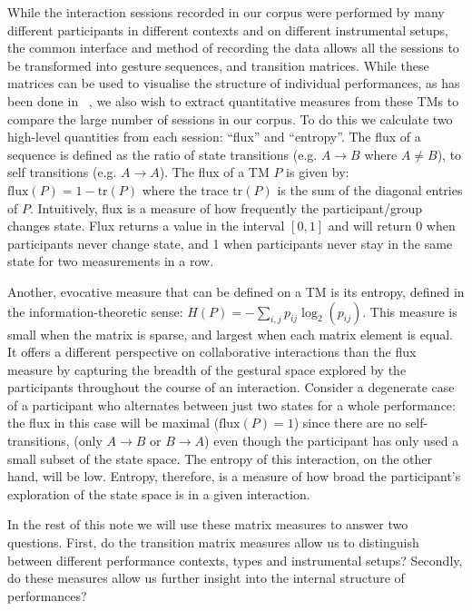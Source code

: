 \documentclass{sigchi}
\begin{document}
While the interaction sessions recorded in our corpus were performed
by many different participants in
different contexts and on different instrumental setups, the common
interface and method of recording the data allows all the sessions to
be transformed into gesture sequences, and transition matrices. While
these matrices can be used to visualise the structure of individual
performances, as has been done in ~\cite{Swift:2014tya}, we also wish to extract quantitative
measures from these TMs to compare the large number of sessions in our
corpus.
To do this we calculate two high-level quantities from each session:
``flux'' and ``entropy''. The flux of a sequence is defined as the
ratio of state transitions (e.g. $A \rightarrow B$ where $A \neq B$),
to self transitions (e.g. $A \rightarrow A $). The flux of a TM $P$ is
given by: $\mathrm{flux}(P) = 1 - \mathrm{tr}(P)$ where the trace
$\mathrm{tr}(P)$ is the sum of the diagonal entries of $P$.
Intuitively, flux is a measure of how frequently the participant/group
changes state. Flux returns a value in the interval $[0,1]$ and will
return 0 when participants never change state, and 1 when participants
never stay in the same state for two measurements in a row.

Another, evocative measure that can be defined on a TM is its
entropy, defined in the information-theoretic\cite{Shannon:1948rt}
sense: $H(P) = -\sum_{i,j}p_{ij}\log_2(p_{ij})$. This measure
is small when the matrix is sparse, and largest when each matrix
element is equal. It offers a different perspective on collaborative
interactions than the flux measure by capturing the breadth of the
gestural space explored by the participants throughout the course of
an interaction. Consider a degenerate case of a participant who
alternates between just two states for a whole performance: the flux in
this case will be maximal ($\mathrm{flux}(P) = 1$) since there are no
self-transitions, (only $A \rightarrow B$ or $ B \rightarrow A$) even
though the participant has only used a small subset of the state
space. The entropy of this interaction, on the other hand, will be
low. Entropy, therefore, is a measure of how broad the participant's
exploration of the state space is in a given interaction.

In the rest of this note we will use these matrix measures to answer
two questions. First, do the transition matrix measures allow us to
distinguish between different performance contexts, types and
instrumental setups? Secondly, do these measures allow us further
insight into the internal structure of performances?
\end{document}
